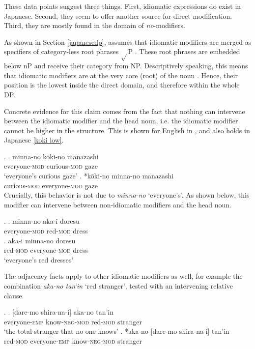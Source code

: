 These data points suggest three things. First, idiomatic expressions do exist in Japanese. Second, they seem to offer another source for direct modification. Third, they are mostly found in the domain of \textit{no}-modifiers.

As shown in Section \ref{japanesedp}, \citet{svenonius:2008:position} assumes that idiomatic modifiers are merged as specifiers of category-less root phrases $\sqrt{}$P \citep{marantz:1997:no}. These root phrases are embedded below nP and receive their category from NP. Descriptively speaking, this means that idiomatic modifiers are at the very core (root) of the noun \citep[36–37]{svenonius:2008:position}. Hence, their position is the lowest inside the direct domain, and therefore within the whole DP.

Concrete evidence for this claim comes from the fact that nothing can intervene between the idiomatic modifier and the head noun, i.e. the idiomatic modifier cannot be higher in the structure. This is shown for  English in \citet[36–37]{svenonius:2008:position}, and also holds in Japanese \ref{koki low}.

\ex. \label{koki low} \ag. minna-no kōki-no manazashi\\
everyone-\textsc{mod} curious-\textsc{mod} gaze\\
`everyone's curious gaze'
\bg. *kōki-no minna-no manazashi\\
curious-\textsc{mod} everyone-\textsc{mod} gaze\\

Crucially, this behavior is not due to \textit{minna-no} `everyone’s’. As shown below, this modifier can intervene between non-idiomatic modifiers and the head noun.

\ex. \ag. minna-no aka-i doresu\\
everyone-\textsc{mod} red-\textsc{mod} dress\\
\bg. aka-i minna-no doresu\\
red-\textsc{mod} everyone-\textsc{mod} dress\\
`everyone's red dresses'

The adjacency facts apply to other idiomatic modifiers as well, for example the combination \textit{aka-no tan'in} `red stranger', tested with an intervening relative clause.

%

\ex. \ag. [dare-mo shira-na-i] aka-no tan'in\\
everyone-\textsc{emp} know-\textsc{neg}-\textsc{mod} red-\textsc{mod} stranger\\
`the total stranger that no one knows'
\bg. *aka-no [dare-mo shira-na-i] tan'in\\
red-\textsc{mod} everyone-\textsc{emp} know-\textsc{neg-mod} stranger\\

